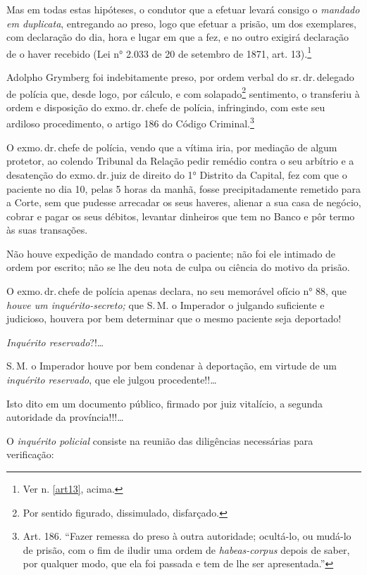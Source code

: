 Mas em todas estas hipóteses, o condutor que a efetuar levará consigo o
\emph{mandado em duplicata}, entregando ao preso, logo que efetuar a
prisão, um dos exemplares, com declaração do dia, hora e lugar em que a
fez, e no outro exigirá declaração de o haver recebido (Lei n° 2.033 de
20 de setembro de 1871, art. 13).\footnote{Ver n. \ref{art13}, acima.}

Adolpho Grymberg foi indebitamente preso, por ordem verbal do sr.\,dr.\,delegado de polícia que, desde logo, por cálculo, e com
solapado\footnote{Por sentido figurado, dissimulado, disfarçado.}
sentimento, o transferiu à ordem e disposição do exmo.\,dr.\,chefe de
polícia, infringindo, com este seu ardiloso procedimento, o artigo 186
do Código Criminal.\footnote{Art. 186. ``Fazer remessa do preso
  à outra autoridade; ocultá-lo, ou mudá-lo de prisão, com o fim de
  iludir uma ordem de \emph{habeas-corpus} depois de saber, por qualquer
  modo, que ela foi passada e tem de lhe ser apresentada.''}

O exmo.\,dr.\,chefe de polícia, vendo que a vítima iria, por mediação de
algum protetor, ao colendo Tribunal da Relação pedir remédio contra o
seu arbítrio e a desatenção do exmo.\,dr.\,juiz de direito do 1° Distrito
da Capital, fez com que o paciente no dia 10, pelas 5 horas da manhã,
fosse precipitadamente remetido para a Corte, sem que pudesse arrecadar
os seus haveres, alienar a sua casa de negócio, cobrar e pagar os seus
débitos, levantar dinheiros que tem no Banco e pôr termo às suas
transações.

Não houve expedição de mandado contra o paciente; não foi ele intimado
de ordem por escrito; não se lhe deu nota de culpa ou ciência do motivo
da prisão.

O exmo.\,dr.\,chefe de polícia apenas declara, no seu memorável ofício n°
88, que \emph{houve um inquérito-secreto;} que S.\,M. o Imperador o
julgando suficiente e judicioso, houvera por bem determinar que o mesmo
paciente seja deportado!

\emph{Inquérito reservado}?!\ldots{}

S.\,M. o Imperador houve por bem condenar à deportação, em virtude de um
\emph{inquérito reservado}, que ele julgou procedente!!\ldots{}

Isto dito em um documento público, firmado por juiz vitalício, a segunda
autoridade da província!!!\ldots{}

O \emph{inquérito policial} consiste na reunião das diligências
necessárias para verificação:

